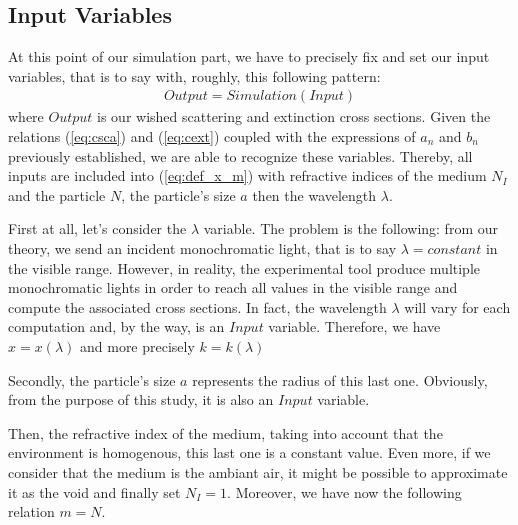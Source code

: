 \documentclass{article}
\numberwithin{equation}{section}
\begin{document}
\subsection{Input Variables}

At this point of our simulation part, we have to precisely fix and set our input variables, that is to say with, roughly, this following pattern:
\begin{align}
Output = Simulation(Input)
\end{align}
where $Output$ is our wished scattering and extinction cross sections. Given the relations (\ref{eq:csca}) and (\ref{eq:cext}) coupled with the expressions of $a_{n}$ and $b_{n}$ previously established, we are able to recognize these variables. Thereby, all inputs are included into (\ref{eq:def_x_m}) with refractive indices of the medium $N_{I}$ and the particle $N$, the particle's size $a$ then the wavelength $\lambda$.

First at all, let's consider the $\lambda$ variable. The problem is the following: from our theory, we send an incident monochromatic light, that is to say $\lambda=constant$ in the visible range. However, in reality, the experimental tool produce multiple monochromatic lights in order to reach all values in the visible range and compute the associated cross sections. In fact, the wavelength $\lambda$ will vary for each computation and, by the way, is an $Input$ variable. Therefore, we have $x=x(\lambda)$ and more precisely $k=k(\lambda)$

Secondly, the particle's size $a$ represents the radius of this last one. Obviously, from the purpose of this study, it is also an $Input$ variable.

Then, the refractive index of the medium, taking into account that the environment is homogenous, this last one is a constant value. Even more, if we consider that the medium is the ambiant air, it might be possible to approximate it as the void and finally set $N_{I}=1$. Moreover, we have now the following relation $m=N$.
\end{document}
